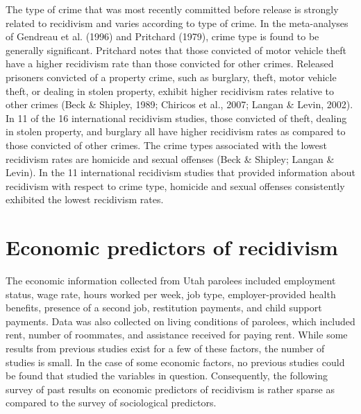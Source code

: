 The type of crime that was most recently committed before release is strongly related to recidivism and varies according to type of crime.  In the meta-analyses of Gendreau et al. (1996) and Pritchard (1979), crime type is found to be generally significant.  Pritchard notes that those convicted of motor vehicle theft have a higher recidivism rate than those convicted for other crimes.  Released prisoners convicted of a property crime, such as burglary, theft, motor vehicle theft, or dealing in stolen property, exhibit higher recidivism rates relative to other crimes (Beck \& Shipley, 1989; Chiricos et al., 2007; Langan \& Levin, 2002).  In 11 of the 16 international recidivism studies, those convicted of theft, dealing in stolen property, and burglary all have higher recidivism rates as compared to those convicted of other crimes.  The crime types associated with the lowest recidivism rates are homicide and sexual offenses (Beck \& Shipley; Langan \& Levin).  In the 11 international recidivism studies that provided information about recidivism with respect to crime type, homicide and sexual offenses consistently exhibited the lowest recidivism rates.

\section{Economic predictors of recidivism}

The economic information collected from Utah parolees included employment status, wage rate, hours worked per week, job type, employer-provided health benefits, presence of a second job, restitution payments, and child support payments.  Data was also collected on living conditions of parolees, which included rent, number of roommates, and assistance received for paying rent.  While some results from previous studies exist for a few of these factors, the number of studies is small.  In the case of some economic factors, no previous studies could be found that studied the variables in question.  Consequently, the following survey of past results on economic predictors of recidivism is rather sparse as compared to the survey of sociological predictors.

